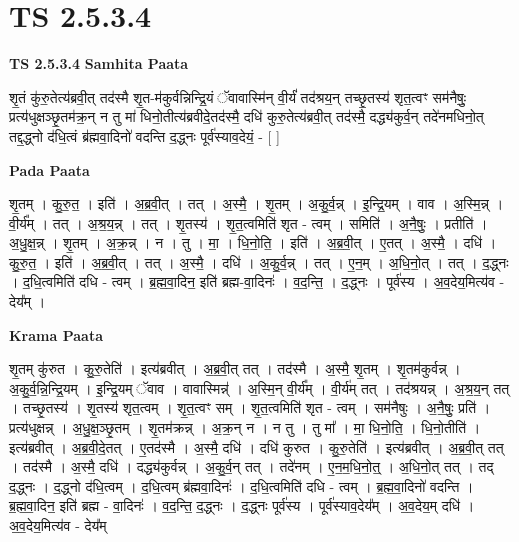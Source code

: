 \documentclass[17pt]{extarticle}
\begin{document}
\section*{ TS 2.5.3.4 }

\textbf{TS 2.5.3.4 } \newline
\textbf{Samhita Paata} \newline

शृ॒तं कु॑रु॒तेत्य॑ब्रवी॒त् तद॑स्मै शृ॒त-म॑कुर्वन्निन्द्रि॒यं ॅवावास्मि॑न् वी॒र्यं॑ तद॑श्रय॒न् तच्छृ॒तस्य॑ शृत॒त्वꣳ सम॑नैषुः॒ प्रत्य॑धुक्षञ्छृ॒तम॑क्र॒न् न तु मा॑ धिनो॒तीत्य॑ब्रवीदे॒तद॑स्मै॒ दधि॑ कुरु॒तेत्य॑ब्रवी॒त् तद॑स्मै॒ दद्ध्य॑कुर्व॒न् तदे॑नमधिनो॒त् तद्द॒द्ध्नो द॑धि॒त्वं ब्र॑ह्मवा॒दिनो॑ वदन्ति द॒द्ध्नः पूर्व॑स्याव॒देयं॒ - [  ] \newline

\textbf{Pada Paata} \newline

शृ॒तम् । कु॒रु॒त॒ । इति॑ । अ॒ब्र॒वी॒त् । तत् । अ॒स्मै॒ । शृ॒तम् । अ॒कु॒र्व॒न्न् । इ॒न्द्रि॒यम् । वाव । अ॒स्मि॒न्न् । वी॒र्य᳚म् । तत् । अ॒श्र॒य॒न्न् । तत् । शृ॒तस्य॑ । शृ॒त॒त्वमिति॑ शृत - त्वम् । समिति॑ । अ॒नै॒षुः॒ । प्रतीति॑ । अ॒धु॒क्ष॒न्न् । शृ॒तम् । अ॒क्र॒न्न् । न । तु । मा॒ । धि॒नो॒ति॒ । इति॑ । अ॒ब्र॒वी॒त् । ए॒तत् । अ॒स्मै॒ । दधि॑ । कु॒रु॒त॒ । इति॑ । अ॒ब्र॒वी॒त् । तत् । अ॒स्मै॒ । दधि॑ । अ॒कु॒र्व॒न्न् । तत् । ए॒न॒म् । अ॒धि॒नो॒त् । तत् । द॒द्ध्नः । द॒धि॒त्वमिति॑ दधि - त्वम् । ब्र॒ह्म॒वा॒दिन॒ इति॑ ब्रह्म-वा॒दिनः॑ । व॒द॒न्ति॒ । द॒द्ध्नः । पूर्व॑स्य । अ॒व॒देय॒मित्य॑व - देय᳚म् ।  \newline


\textbf{Krama Paata} \newline

शृ॒तम् कु॑रुत । कु॒रु॒तेति॑ । इत्य॑ब्रवीत् । अ॒ब्र॒वी॒त् तत् । तद॑स्मै । अ॒स्मै॒ शृ॒तम् । शृ॒तम॑कुर्वन्न् । अ॒कु॒र्व॒न्नि॒न्द्रि॒यम् । इ॒न्द्रि॒यम् ॅवाव । वावास्मिन्न्॑ । अ॒स्मि॒न् वी॒र्य᳚म् । वी॒र्य॑म् तत् । तद॑श्रयन्न् । अ॒श्र॒य॒न् तत् । तच्छृ॒तस्य॑ । शृ॒तस्य॑ शृत॒त्वम् । शृ॒त॒त्वꣳ सम् । शृ॒त॒त्वमिति॑ शृत - त्वम् । सम॑नैषुः । अ॒नै॒षुः॒ प्रति॑ । प्रत्य॑धुक्षन्न् । अ॒धु॒क्ष॒ञ्छृ॒तम् । शृ॒तम॑क्रन्न् । अ॒क्र॒न् न । न तु । तु मा᳚ । मा॒ धि॒नो॒ति॒ । धि॒नो॒तीति॑ । इत्य॑ब्रवीत् । अ॒ब्र॒वी॒दे॒तत् । ए॒तद॑स्मै । अ॒स्मै॒ दधि॑ । दधि॑ कुरुत । कु॒रु॒तेति॑ । इत्य॑ब्रवीत् । अ॒ब्र॒वी॒त् तत् । तद॑स्मै । अ॒स्मै॒ दधि॑ । दद्ध्य॑कुर्वन्न् । अ॒कु॒र्व॒न् तत् । तदे॑नम् । ए॒न॒म॒धि॒नो॒त्॒ । अ॒धि॒नो॒त् तत् । तद् द॒द्ध्नः । द॒द्ध्नो द॑धि॒त्वम् । द॒धि॒त्वम् ब्र॑ह्मवा॒दिनः॑ । द॒धि॒त्वमिति॑ दधि - त्वम् । ब्र॒ह्म॒वा॒दिनो॑ वदन्ति । ब्र॒ह्म॒वा॒दिन॒ इति॑ ब्रह्म - वा॒दिनः॑ । व॒द॒न्ति॒ द॒द्ध्नः । द॒द्ध्नः पूर्व॑स्य । पूर्व॑स्याव॒देय᳚म् । अ॒व॒देय॒म् दधि॑ । अ॒व॒देय॒मित्य॑व - देय᳚म् \newline
\end{document}
